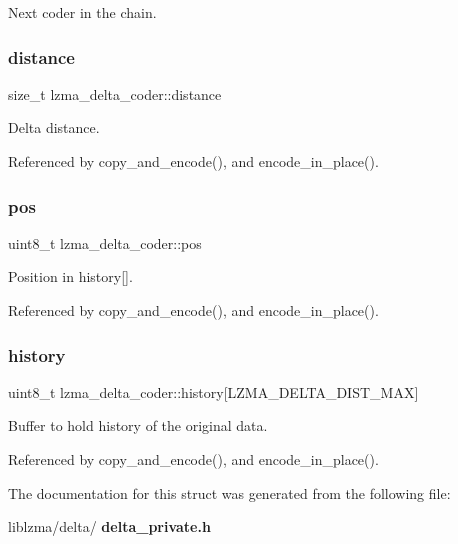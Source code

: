 Next coder in the chain. 

\mbox{\label{structlzma__delta__coder_a739d2bb4ce9e94ba41bd88bf4b8c171a}} 
\subsubsection{distance}
{\footnotesize\ttfamily size\+\_\+t lzma\+\_\+delta\+\_\+coder\+::distance}



Delta distance. 



Referenced by copy\+\_\+and\+\_\+encode(), and encode\+\_\+in\+\_\+place().

\mbox{\label{structlzma__delta__coder_a2d672d2955791189ddfc4246c287e65a}} 
\subsubsection{pos}
{\footnotesize\ttfamily uint8\+\_\+t lzma\+\_\+delta\+\_\+coder\+::pos}



Position in history[]. 



Referenced by copy\+\_\+and\+\_\+encode(), and encode\+\_\+in\+\_\+place().

\mbox{\label{structlzma__delta__coder_a3e4e19b88a2140ae1e4baac5f1489e94}} 
\subsubsection{history}
{\footnotesize\ttfamily uint8\+\_\+t lzma\+\_\+delta\+\_\+coder\+::history[L\+Z\+M\+A\+\_\+\+D\+E\+L\+T\+A\+\_\+\+D\+I\+S\+T\+\_\+\+M\+AX]}



Buffer to hold history of the original data. 



Referenced by copy\+\_\+and\+\_\+encode(), and encode\+\_\+in\+\_\+place().



The documentation for this struct was generated from the following file\+:\begin{DoxyCompactItemize}
\item 
liblzma/delta/\textbf{ delta\+\_\+private.\+h}\end{DoxyCompactItemize}
